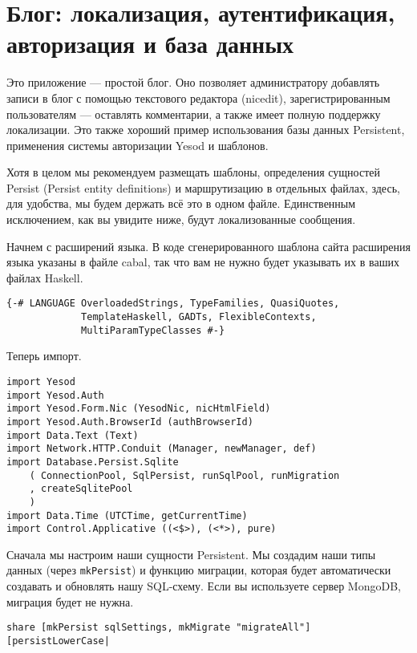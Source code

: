 ﻿\chapter{Блог: локализация, аутентификация, авторизация и база данных}
\label{chap:blog}

Это приложение --- простой блог. Оно позволяет администратору добавлять записи в блог с помощью текстового редактора (nicedit), зарегистрированным пользователям --- оставлять комментарии, а также имеет полную поддержку локализации. Это также хороший пример использования базы данных Persistent, применения системы авторизации Yesod и шаблонов.

Хотя в целом мы рекомендуем размещать шаблоны, определения сущностей Persist (Persist entity definitions) и маршрутизацию в отдельных файлах, здесь, для удобства, мы будем держать всё это в одном файле. Единственным исключением, как вы увидите ниже, будут локализованные сообщения.

Начнем с расширений языка. В коде сгенерированного шаблона сайта расширения языка указаны в файле cabal, так что вам не нужно будет указывать их в ваших файлах Haskell.
 
\begin{lstlisting}
{-# LANGUAGE OverloadedStrings, TypeFamilies, QuasiQuotes,
             TemplateHaskell, GADTs, FlexibleContexts,
             MultiParamTypeClasses #-}
\end{lstlisting}
 
Теперь импорт. 

\begin{lstlisting} 
import Yesod
import Yesod.Auth
import Yesod.Form.Nic (YesodNic, nicHtmlField)
import Yesod.Auth.BrowserId (authBrowserId)
import Data.Text (Text)
import Network.HTTP.Conduit (Manager, newManager, def)
import Database.Persist.Sqlite
    ( ConnectionPool, SqlPersist, runSqlPool, runMigration
    , createSqlitePool
    )
import Data.Time (UTCTime, getCurrentTime)
import Control.Applicative ((<$>), (<*>), pure)
\end{lstlisting}%

Сначала мы настроим наши сущности Persistent. Мы создадим наши типы данных (через \lstinline!mkPersist!) и функцию миграции, которая будет автоматически создавать и обновлять нашу SQL-схему. Если вы используете сервер MongoDB, миграция будет не нужна.

\begin{lstlisting}
share [mkPersist sqlSettings, mkMigrate "migrateAll"] [persistLowerCase|
\end{lstlisting}
 
